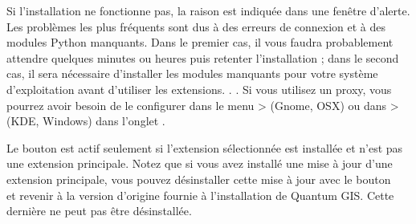 Si l'installation ne fonctionne pas, la raison est indiquée dans une fenêtre d'alerte. Les problèmes les plus fréquents sont dus à des erreurs de connexion et à des modules Python manquants. Dans le premier cas, il vous faudra probablement attendre quelques minutes ou heures puis retenter l'installation ; dans le second cas, il sera nécessaire d'installer les modules manquants pour votre système d'exploitation avant d'utiliser les extensions. . . Si vous utilisez un proxy, vous pourrez avoir besoin de le configurer dans le menu  >  (Gnome, OSX) ou dans  >  (KDE, Windows) dans l'onglet .

Le bouton  est actif seulement si l'extension sélectionnée est installée et n'est pas une extension principale. Notez que si vous avez installé une mise à jour d'une extension principale, vous pouvez désinstaller cette mise à jour avec le bouton\\  et revenir à la version d'origine fournie à l'installation de Quantum GIS. Cette dernière ne peut pas être désinstallée.

